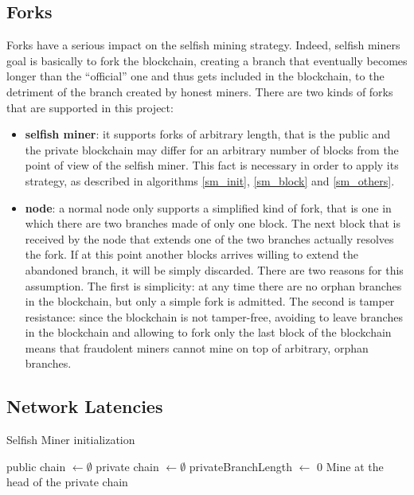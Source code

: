 \documentclass{article}
\begin{document}
\subsection{Forks} 
Forks have a serious impact on the selfish mining strategy. Indeed, selfish miners goal is basically to fork the blockchain, creating a branch that eventually becomes longer than the ``official'' one and thus gets included in the blockchain, to the detriment of the branch created by honest miners. There are two kinds of forks that are supported in this project:
\begin{itemize}
\item \textbf{selfish miner}: it supports forks of arbitrary length, that is the public and the private blockchain may differ for an arbitrary number of blocks from the point of view of the selfish miner. This fact is necessary in order to apply its strategy, as described in algorithms \ref{sm_init}, \ref{sm_block} and \ref{sm_others}.
\item{\textbf{node}}: a normal node only supports a simplified kind of fork, that is one in which there are two branches made of only one block. The next block that is received by the node that extends one of the two branches actually resolves the fork. If at this point another blocks arrives willing to extend the abandoned branch, it will be simply discarded. There are two reasons for this assumption. The first is simplicity: at any time there are no orphan branches in the blockchain, but only a simple fork is admitted. The second is tamper resistance: since the blockchain is not tamper-free, avoiding to leave branches in the blockchain and allowing to fork only the last block of the blockchain means that fraudolent miners cannot mine on top of arbitrary, orphan branches.  
\end{itemize}

\subsection{Network Latencies} 

\begin{algorithm}
\caption{Selfish Miner initialization}\label{sm_init}
\begin{algorithmic}[1]
\State public chain $\gets \emptyset$
\State private chain $\gets \emptyset$
\State privateBranchLength $\gets$ 0
\State Mine at the head of the private chain 
\end{algorithmic}
\end{algorithm}
\end{document}
